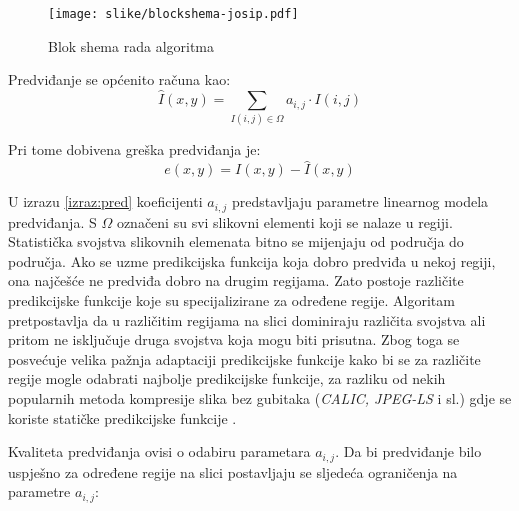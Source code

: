 \documentclass[times, utf8, zavrsni, numeric, sort]{fer}
\begin{document}
\begin{figure}[htb]
\centering
\texttt{[image: slike/blockshema-josip.pdf]}
\caption{Blok shema rada algoritma}
\label{fig:blockshema}
\end{figure}

Predviđanje se općenito računa kao:
\begin{equation}
\label{izraz:pred}
\hat{I}(x,y) = \sum_{I(i,j)\in \Omega} a_{i,j} \cdot I(i,j)
\end{equation}

Pri tome dobivena greška predviđanja je:
\begin{equation}
e(x,y) = I(x,y) - \hat{I}(x,y)
\end{equation}


U izrazu \ref{izraz:pred} koeficijenti $a_{i,j}$ predstavljaju parametre linearnog modela predviđanja. S $\Omega$ označeni su svi slikovni elementi koji se nalaze u regiji. Statistička svojstva slikovnih elemenata bitno se mijenjaju od područja do područja. Ako se uzme predikcijska funkcija koja dobro predviđa u nekoj regiji, ona najčešće ne predviđa dobro na drugim regijama. Zato postoje različite predikcijske funkcije koje su specijalizirane za određene regije. Algoritam pretpostavlja da u različitim regijama na slici dominiraju različita svojstva ali pritom ne isključuje druga svojstva koja mogu biti prisutna. Zbog toga se posvećuje velika pažnja adaptaciji predikcijske funkcije kako bi se za različite regije mogle odabrati najbolje predikcijske funkcije, za razliku od nekih popularnih metoda kompresije slika bez gubitaka (\emph{CALIC, JPEG-LS} i sl.) gdje se koriste statičke predikcijske funkcije \cite{Wu:95, Wu:97, Weinberger:98}.

Kvaliteta predviđanja ovisi o odabiru parametara $a_{i,j}$. Da bi predviđanje bilo uspješno za određene regije na slici postavljaju se sljedeća ograničenja na parametre $a_{i,j}$:
\end{document}
